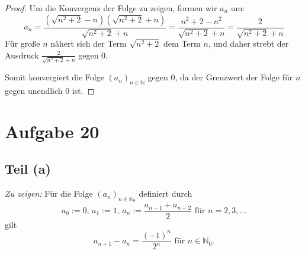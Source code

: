 \documentclass{article}
\theoremstyle{definition}
\theoremstyle{remark}
\begin{document}
\begin{proof}
	Um die Konvergenz der Folge zu zeigen, formen wir \( a_n \) um:
	\[ a_n = \frac{\left( \sqrt{n^2 + 2} - n \right) \left( \sqrt{n^2 + 2} + n \right)}{\sqrt{n^2 + 2} + n} = \frac{n^2 + 2 - n^2}{\sqrt{n^2 + 2} + n} = \frac{2}{\sqrt{n^2 + 2} + n} \]
	Für große \( n \) nähert sich der Term \( \sqrt{n^2 + 2} \) dem Term \( n \), und daher strebt der Ausdruck \( \frac{2}{\sqrt{n^2 + 2} + n} \) gegen 0.

	Somit konvergiert die Folge \( (a_n)_{n\in\mathbb{N}} \) gegen 0, da der Grenzwert der Folge für \( n \) gegen unendlich 0 ist.
\end{proof}

\newpage

\section*{Aufgabe 20}

\subsection*{Teil (a)}
\textit{Zu zeigen:} Für die Folge \( (a_n)_{n \in \mathbb{N}_0} \) definiert durch
\[ a_0 := 0, \, a_1 := 1, \, a_n := \frac{a_{n-1} + a_{n-2}}{2} \text{ für } n = 2, 3, \dots \]
gilt
\[ a_{n+1} - a_n = \frac{(-1)^n}{2^n} \text{ für } n \in \mathbb{N}_0. \]
\end{document}
